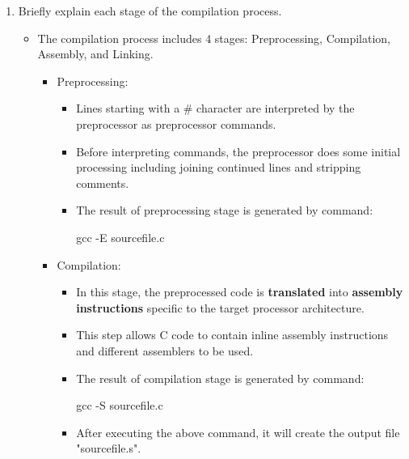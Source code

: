 \documentclass[a4paper]{article}
\begin{document}
\begin{enumerate}
    \item Briefly explain each stage of the compilation process.
    \begin{itemize}
        \item The compilation process includes 4 stages: Preprocessing, Compilation, Assembly, and Linking.
        \begin{itemize}
            \item Preprocessing:
            \begin{itemize}
                \item Lines starting with a \# character are interpreted by the preprocessor as preprocessor commands.
                \item Before interpreting commands, the preprocessor does some initial processing including joining continued lines and stripping comments.
                \item The result of preprocessing stage is generated by command: \\
                \begin{center}
                    gcc -E sourcefile.c
                \end{center}
            \end{itemize}

            \item Compilation:
            \begin{itemize}
                \item In this stage, the preprocessed code is \textbf{translated} into \textbf{assembly instructions} specific to the target processor architecture.
                \item This step allows C code to contain inline assembly instructions and different assemblers to be used.
                \item The result of compilation stage is generated by command: \\
                \begin{center}
                    gcc -S sourcefile.c
                \end{center}
                \item After executing the above command, it will create the output file "sourcefile.s". 
            \end{itemize}


\end{itemize}
\end{itemize}
\end{enumerate}
\end{document}
